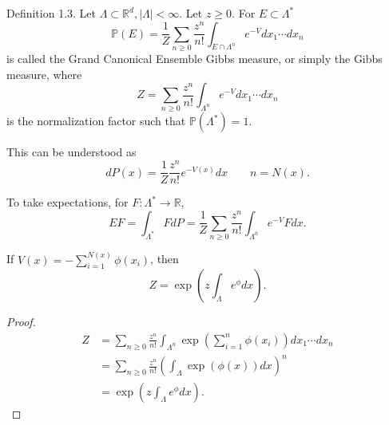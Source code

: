 \begin{definition}
	Definition 1.3. Let $\Lambda \subset \mathbb{R}^d,|\Lambda|<\infty$. Let $z \geq 0$. For $E \subset \Lambda^*$
\[
\mathbb{P}(E)=\frac{1}{Z} \sum_{n \geq 0} \frac{z^n}{n !} \int_{E \cap \Lambda^n} e^{-V} d x_1 \cdots d x_n
\]
is called the Grand Canonical Ensemble Gibbs measure, or simply the Gibbs measure, where
\[
Z=\sum_{n \geq 0} \frac{z^n}{n !} \int_{\Lambda^n} e^{-V} d x_1 \cdots d x_n
\]
is the normalization factor such that $\mathbb{P}\left(\Lambda^*\right)=1$.
\end{definition}

This can be understood as
\[
	d P(x) = \frac{1}{Z} \frac{z^n}{n!} e^{-V(x)} d x \qquad n = N(x)
.\] 

To take expectations, for $F: \Lambda^* \to \mathbb{R}$,
\[
	E F = \int _{\Lambda^*} F d P = \frac{1}{Z} \sum_{n \ge 0} \frac{z^n}{n!} \int_{\Lambda^n} e^{-V} F dx
.\] 

\begin{claim}
	If $V(x) = - \sum_{i = 1}^{N(x)} \phi(x_i)$, then
	\[
		Z = \exp\left( z \int  _\Lambda e^{\phi} dx \right) 
	.\] 
\end{claim}
\begin{proof}
	\begin{align*}
		Z&=\sum_{n \geq 0} \frac{z^n}{n !} \int_{\Lambda^n} \exp\left( \sum_{i = 1}^{n} \phi(x_i) \right)  d x_1 \cdots d x_n\\
		&=\sum_{n \geq 0} \frac{z^n}{n !}\left( \int_{\Lambda} \exp\left(\phi(x) \right)  d x\right)^n\\
		&= \exp\left(z \int _{\Lambda} e^{\phi} dx\right)
	.\end{align*}
\end{proof}





